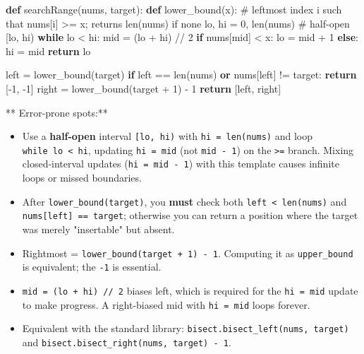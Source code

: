 \documentclass[11pt]{article}
\providecommand{\tightlist}{\setlength{\itemsep}{1pt}\setlength{\parskip}{0pt}}
\newenvironment{Shaded}{\begin{snugshade}}{\end{snugshade}}
\newcommand{\BuiltInTok}[1]{\textcolor[rgb]{0.50,0.55,0.55}{#1}}
\newcommand{\CommentTok}[1]{\textcolor[rgb]{0.48,0.49,0.49}{#1}}
\newcommand{\ControlFlowTok}[1]{\textcolor[rgb]{0.99,0.74,0.29}{\textbf{#1}}}
\newcommand{\DecValTok}[1]{\textcolor[rgb]{0.96,0.45,0.00}{#1}}
\newcommand{\KeywordTok}[1]{\textcolor[rgb]{0.81,0.81,0.76}{\textbf{#1}}}
\newcommand{\NormalTok}[1]{\textcolor[rgb]{0.81,0.81,0.76}{#1}}
\newcommand{\OperatorTok}[1]{\textcolor[rgb]{0.81,0.81,0.76}{#1}}
\begin{document}

\begin{Shaded}
\begin{Highlighting}[]
\KeywordTok{def}\NormalTok{ searchRange(nums, target):}
    \KeywordTok{def}\NormalTok{ lower\_bound(x):}
        \CommentTok{\# leftmost index i such that nums[i] \textgreater{}= x; returns len(nums) if none}
\NormalTok{        lo, hi }\OperatorTok{=} \DecValTok{0}\NormalTok{, }\BuiltInTok{len}\NormalTok{(nums)          }\CommentTok{\# half{-}open [lo, hi)}
        \ControlFlowTok{while}\NormalTok{ lo }\OperatorTok{\textless{}}\NormalTok{ hi:}
\NormalTok{            mid }\OperatorTok{=}\NormalTok{ (lo }\OperatorTok{+}\NormalTok{ hi) }\OperatorTok{//} \DecValTok{2}
            \ControlFlowTok{if}\NormalTok{ nums[mid] }\OperatorTok{\textless{}}\NormalTok{ x:}
\NormalTok{                lo }\OperatorTok{=}\NormalTok{ mid }\OperatorTok{+} \DecValTok{1}
            \ControlFlowTok{else}\NormalTok{:}
\NormalTok{                hi }\OperatorTok{=}\NormalTok{ mid}
        \ControlFlowTok{return}\NormalTok{ lo}

\NormalTok{    left }\OperatorTok{=}\NormalTok{ lower\_bound(target)}
    \ControlFlowTok{if}\NormalTok{ left }\OperatorTok{==} \BuiltInTok{len}\NormalTok{(nums) }\KeywordTok{or}\NormalTok{ nums[left] }\OperatorTok{!=}\NormalTok{ target:}
        \ControlFlowTok{return}\NormalTok{ [}\OperatorTok{{-}}\DecValTok{1}\NormalTok{, }\OperatorTok{{-}}\DecValTok{1}\NormalTok{]}
\NormalTok{    right }\OperatorTok{=}\NormalTok{ lower\_bound(target }\OperatorTok{+} \DecValTok{1}\NormalTok{) }\OperatorTok{{-}} \DecValTok{1}
    \ControlFlowTok{return}\NormalTok{ [left, right]}
\end{Highlighting}
\end{Shaded}

** Error-prone spots:**

\begin{itemize}
\tightlist
\item
  Use a \textbf{half-open} interval \texttt{{[}lo,\ hi)} with \texttt{hi\ =\ len(nums)} and loop \texttt{while\ lo\ \textless{}\ hi}, updating \texttt{hi\ =\ mid} (not \texttt{mid\ -\ 1}) on the \texttt{\textgreater{}=} branch. Mixing closed-interval updates (\texttt{hi\ =\ mid\ -\ 1}) with this template causes infinite loops or missed boundaries.
\item
  After \texttt{lower\_bound(target)}, you \textbf{must} check both \texttt{left\ \textless{}\ len(nums)} and \texttt{nums{[}left{]}\ ==\ target}; otherwise you can return a position where the target was merely "insertable" but absent.
\item
  Rightmost = \texttt{lower\_bound(target\ +\ 1)\ -\ 1}. Computing it as \texttt{upper\_bound} is equivalent; the \texttt{-1} is essential.
\item
  \texttt{mid\ =\ (lo\ +\ hi)\ //\ 2} biases left, which is required for the \texttt{hi\ =\ mid} update to make progress. A right-biased mid with \texttt{hi\ =\ mid} loops forever.
\item
  Equivalent with the standard library: \texttt{bisect.bisect\_left(nums,\ target)} and \texttt{bisect.bisect\_right(nums,\ target)\ -\ 1}.
\end{itemize}
\end{document}
